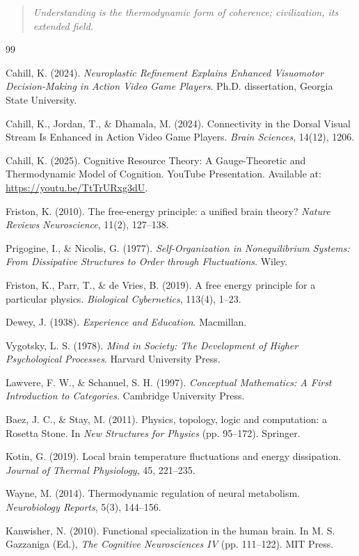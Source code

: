 \documentclass[12pt,a4paper]{article}
\begin{document}
\begin{quote}
\emph{Understanding is the thermodynamic form of coherence; civilization, its extended field.}
\end{quote}

\begin{thebibliography}{99}

Cahill, K. (2024). \emph{Neuroplastic Refinement Explains Enhanced Visuomotor Decision-Making in Action Video Game Players}. Ph.D. dissertation, Georgia State University.

Cahill, K., Jordan, T., \& Dhamala, M. (2024). Connectivity in the Dorsal Visual Stream Is Enhanced in Action Video Game Players. \emph{Brain Sciences}, 14(12), 1206.

Cahill, K. (2025). Cognitive Resource Theory: A Gauge-Theoretic and Thermodynamic Model of Cognition. YouTube Presentation. Available at: \url{https://youtu.be/TtTrURxg3dU}.

Friston, K. (2010). The free-energy principle: a unified brain theory? \emph{Nature Reviews Neuroscience}, 11(2), 127--138.

Prigogine, I., \& Nicolis, G. (1977). \emph{Self-Organization in Nonequilibrium Systems: From Dissipative Structures to Order through Fluctuations}. Wiley.

Friston, K., Parr, T., \& de Vries, B. (2019). A free energy principle for a particular physics. \emph{Biological Cybernetics}, 113(4), 1--23.

Dewey, J. (1938). \emph{Experience and Education}. Macmillan.

Vygotsky, L. S. (1978). \emph{Mind in Society: The Development of Higher Psychological Processes}. Harvard University Press.

Lawvere, F. W., \& Schanuel, S. H. (1997). \emph{Conceptual Mathematics: A First Introduction to Categories}. Cambridge University Press.

Baez, J. C., \& Stay, M. (2011). Physics, topology, logic and computation: a Rosetta Stone. In \emph{New Structures for Physics} (pp. 95--172). Springer.

Kotin, G. (2019). Local brain temperature fluctuations and energy dissipation. \emph{Journal of Thermal Physiology}, 45, 221--235.

Wayne, M. (2014). Thermodynamic regulation of neural metabolism. \emph{Neurobiology Reports}, 5(3), 144--156.

Kanwisher, N. (2010). Functional specialization in the human brain. In M. S. Gazzaniga (Ed.), \emph{The Cognitive Neurosciences IV} (pp. 111--122). MIT Press.

\end{thebibliography}
\end{document}
